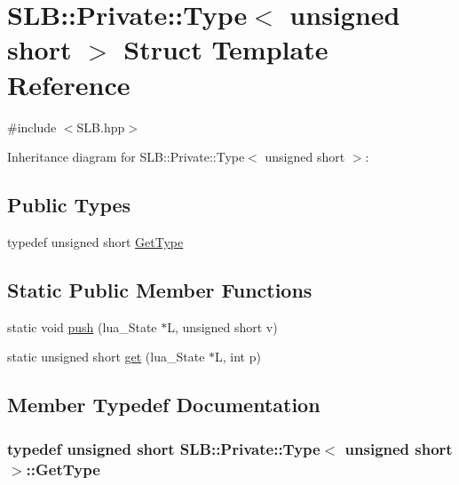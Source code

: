 \hypertarget{structSLB_1_1Private_1_1Type_3_01unsigned_01short_01_4}{}\section{S\+LB\+:\+:Private\+:\+:Type$<$ unsigned short $>$ Struct Template Reference}
\label{structSLB_1_1Private_1_1Type_3_01unsigned_01short_01_4}


{\ttfamily \#include $<$S\+L\+B.\+hpp$>$}



Inheritance diagram for S\+LB\+:\+:Private\+:\+:Type$<$ unsigned short $>$\+:
\subsection*{Public Types}
\begin{DoxyCompactItemize}
\item 
typedef unsigned short \hyperlink{structSLB_1_1Private_1_1Type_3_01unsigned_01short_01_4_a0bc5fc8424c5532d9c7ac63540c4e03d}{Get\+Type}
\end{DoxyCompactItemize}
\subsection*{Static Public Member Functions}
\begin{DoxyCompactItemize}
\item 
static void \hyperlink{structSLB_1_1Private_1_1Type_3_01unsigned_01short_01_4_a29ffced9d367de1cc5982ad42d3dbc0f}{push} (lua\+\_\+\+State $\ast$L, unsigned short v)
\item 
static unsigned short \hyperlink{structSLB_1_1Private_1_1Type_3_01unsigned_01short_01_4_a1cd27bb5c987b31494c03816e65fad60}{get} (lua\+\_\+\+State $\ast$L, int p)
\end{DoxyCompactItemize}


\subsection{Member Typedef Documentation}
\subsubsection[{\texorpdfstring{Get\+Type}{GetType}}]{\setlength{\rightskip}{0pt plus 5cm}typedef unsigned short {\bf S\+L\+B\+::\+Private\+::\+Type}$<$ unsigned short $>$\+::{\bf Get\+Type}}\hypertarget{structSLB_1_1Private_1_1Type_3_01unsigned_01short_01_4_a0bc5fc8424c5532d9c7ac63540c4e03d}{}\label{structSLB_1_1Private_1_1Type_3_01unsigned_01short_01_4_a0bc5fc8424c5532d9c7ac63540c4e03d}


